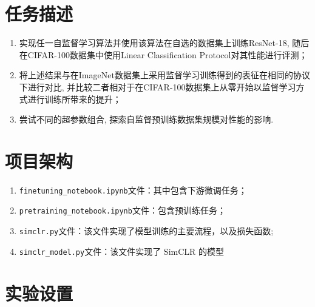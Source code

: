 \documentclass[notitlepage,cs4size,punct,oneside]{ctexrep}
\numberwithin{equation}{chapter}
\theoremstyle{mystyle}
\begin{document}
\section{任务描述}
\begin{enumerate}
\item 实现任一自监督学习算法并使用该算法在自选的数据集上训练ResNet-18, 随后在CIFAR-100数据集中使用Linear Classification Protocol对其性能进行评测；
\item 将上述结果与在ImageNet数据集上采用监督学习训练得到的表征在相同的协议下进行对比, 并比较二者相对于在CIFAR-100数据集上从零开始以监督学习方式进行训练所带来的提升；
\item 尝试不同的超参数组合, 探索自监督预训练数据集规模对性能的影响.
\end{enumerate}

\section{项目架构}
\begin{enumerate}
    \item \texttt{finetuning\_notebook.ipynb}文件：其中包含下游微调任务；
    \item \texttt{pretraining\_notebook.ipynb}文件：包含预训练任务；
    \item \texttt{simclr.py}文件：该文件实现了模型训练的主要流程，以及损失函数;
    \item \texttt{simclr\_model.py}文件：该文件实现了 SimCLR 的模型
    \end{enumerate}

\section{实验设置}
\end{document}
